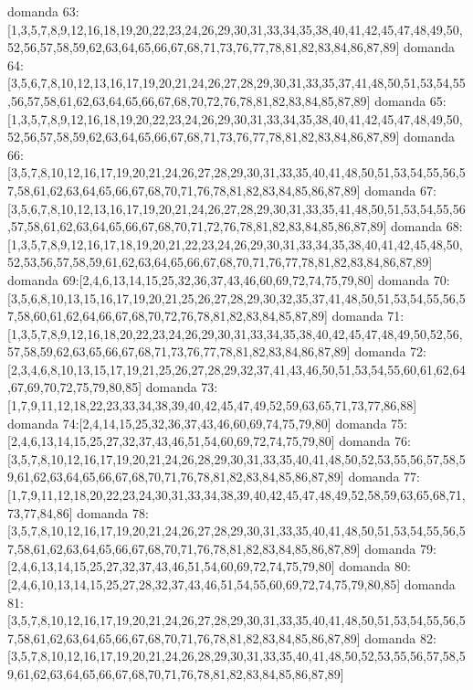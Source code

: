 domanda 63:[1,3,5,7,8,9,12,16,18,19,20,22,23,24,26,29,30,31,33,34,35,38,40,41,42,45,47,48,49,50,52,56,57,58,59,62,63,64,65,66,67,68,71,73,76,77,78,81,82,83,84,86,87,89]
domanda 64:[3,5,6,7,8,10,12,13,16,17,19,20,21,24,26,27,28,29,30,31,33,35,37,41,48,50,51,53,54,55,56,57,58,61,62,63,64,65,66,67,68,70,72,76,78,81,82,83,84,85,87,89]
domanda 65:[1,3,5,7,8,9,12,16,18,19,20,22,23,24,26,29,30,31,33,34,35,38,40,41,42,45,47,48,49,50,52,56,57,58,59,62,63,64,65,66,67,68,71,73,76,77,78,81,82,83,84,86,87,89]
domanda 66:[3,5,7,8,10,12,16,17,19,20,21,24,26,27,28,29,30,31,33,35,40,41,48,50,51,53,54,55,56,57,58,61,62,63,64,65,66,67,68,70,71,76,78,81,82,83,84,85,86,87,89]
domanda 67:[3,5,6,7,8,10,12,13,16,17,19,20,21,24,26,27,28,29,30,31,33,35,41,48,50,51,53,54,55,56,57,58,61,62,63,64,65,66,67,68,70,71,72,76,78,81,82,83,84,85,86,87,89]
domanda 68:[1,3,5,7,8,9,12,16,17,18,19,20,21,22,23,24,26,29,30,31,33,34,35,38,40,41,42,45,48,50,52,53,56,57,58,59,61,62,63,64,65,66,67,68,70,71,76,77,78,81,82,83,84,86,87,89]
domanda 69:[2,4,6,13,14,15,25,32,36,37,43,46,60,69,72,74,75,79,80]
domanda 70:[3,5,6,8,10,13,15,16,17,19,20,21,25,26,27,28,29,30,32,35,37,41,48,50,51,53,54,55,56,57,58,60,61,62,64,66,67,68,70,72,76,78,81,82,83,84,85,87,89]
domanda 71:[1,3,5,7,8,9,12,16,18,20,22,23,24,26,29,30,31,33,34,35,38,40,42,45,47,48,49,50,52,56,57,58,59,62,63,65,66,67,68,71,73,76,77,78,81,82,83,84,86,87,89]
domanda 72:[2,3,4,6,8,10,13,15,17,19,21,25,26,27,28,29,32,37,41,43,46,50,51,53,54,55,60,61,62,64,67,69,70,72,75,79,80,85]
domanda 73:[1,7,9,11,12,18,22,23,33,34,38,39,40,42,45,47,49,52,59,63,65,71,73,77,86,88]
domanda 74:[2,4,14,15,25,32,36,37,43,46,60,69,74,75,79,80]
domanda 75:[2,4,6,13,14,15,25,27,32,37,43,46,51,54,60,69,72,74,75,79,80]
domanda 76:[3,5,7,8,10,12,16,17,19,20,21,24,26,28,29,30,31,33,35,40,41,48,50,52,53,55,56,57,58,59,61,62,63,64,65,66,67,68,70,71,76,78,81,82,83,84,85,86,87,89]
domanda 77:[1,7,9,11,12,18,20,22,23,24,30,31,33,34,38,39,40,42,45,47,48,49,52,58,59,63,65,68,71,73,77,84,86]
domanda 78:[3,5,7,8,10,12,16,17,19,20,21,24,26,27,28,29,30,31,33,35,40,41,48,50,51,53,54,55,56,57,58,61,62,63,64,65,66,67,68,70,71,76,78,81,82,83,84,85,86,87,89]
domanda 79:[2,4,6,13,14,15,25,27,32,37,43,46,51,54,60,69,72,74,75,79,80]
domanda 80:[2,4,6,10,13,14,15,25,27,28,32,37,43,46,51,54,55,60,69,72,74,75,79,80,85]
domanda 81:[3,5,7,8,10,12,16,17,19,20,21,24,26,27,28,29,30,31,33,35,40,41,48,50,51,53,54,55,56,57,58,61,62,63,64,65,66,67,68,70,71,76,78,81,82,83,84,85,86,87,89]
domanda 82:[3,5,7,8,10,12,16,17,19,20,21,24,26,28,29,30,31,33,35,40,41,48,50,52,53,55,56,57,58,59,61,62,63,64,65,66,67,68,70,71,76,78,81,82,83,84,85,86,87,89]
